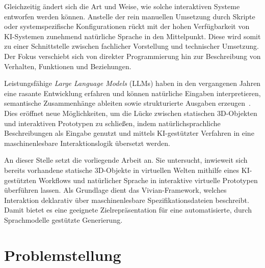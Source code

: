 Gleichzeitig ändert sich die Art und Weise, wie solche interaktiven Systeme entworfen werden können. Anstelle der rein manuellen Umsetzung durch Skripte oder systemspezifische Konfigurationen rückt mit der hohen Verfügbarkeit von KI-Systemen zunehmend natürliche Sprache in den Mittelpunkt. Diese wird somit zu einer Schnittstelle zwischen fachlicher Vorstellung und technischer Umsetzung. Der Fokus verschiebt sich von direkter Programmierung hin zur Beschreibung von Verhalten, Funktionen und Beziehungen.

Leistungsfähige \textit{Large Language Models} (LLMs) haben in den vergangenen Jahren eine rasante Entwicklung erfahren und können natürliche Eingaben interpretieren, semantische Zusammenhänge ableiten sowie strukturierte Ausgaben erzeugen~\cite{caffagniRevolutionMultimodalLarge2024,yinSurveyMultimodalLarge2024}. Dies eröffnet neue Möglichkeiten, um die Lücke zwischen statischen 3D-Objekten und interaktiven Prototypen zu schließen, indem natürlichsprachliche Beschreibungen als Eingabe genutzt und mittels KI-gestützter Verfahren in eine maschinenlesbare Interaktionslogik übersetzt werden.

An dieser Stelle setzt die vorliegende Arbeit an. Sie untersucht, inwieweit sich bereits vorhandene statische 3D-Objekte in virtuellen Welten mithilfe eines KI-gestützten Workflows und natürlicher Sprache in interaktive virtuelle Prototypen überführen lassen. Als Grundlage dient das Vivian-Framework, welches Interaktion deklarativ über maschinenlesbare Spezifikationsdateien beschreibt. Damit bietet es eine geeignete Zielrepräsentation für eine automatisierte, durch Sprachmodelle gestützte Generierung.

\section{Problemstellung}\label{sec:problemstellung}


